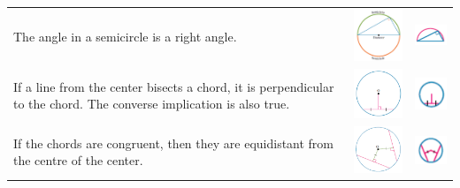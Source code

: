 \documentclass[a4paper,10pt]{report}
\begin{document}
\begin{center}
\begin{tabular}[center]{p{5cm}|p{3cm}|p{2cm}}
		The angle in a semicircle is a right angle.                                                                                                                                                                                  & \includegraphics[width=3cm]{circle theorem 3}  & \includegraphics[width=2cm]{circle theorem 3 symbol}  \\
		If a line from the center bisects a chord, it is perpendicular to the chord.  The converse implication is also true.                                                                                                         & \includegraphics[width=3cm]{circle theorem 4}  & \includegraphics[width=2cm]{circle theorem 4 symbol}  \\
		If the chords are congruent, then they are equidistant from the centre of the center.                                                                                                                                        & \includegraphics[width=3cm]{circle theorem 5}  & \includegraphics[width=2cm]{circle theorem 5 symbol}  \\

\end{tabular}
\end{center}
\end{document}
